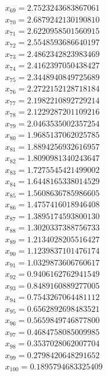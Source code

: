 \begin{multicols}{3}
\begin{align*}
		x_{69} = 2.7523243683867061\\
		x_{70} = 2.6879242130190810\\
		x_{71} = 2.6220958501560915\\
		x_{72} = 2.5548593686640197\\
		x_{73} = 2.4862342823983469\\
		x_{74} = 2.4162397050438427\\
		x_{75} = 2.3448940849725689\\
		x_{76} = 2.2722152128718184\\
		x_{77} = 2.1982210892729214\\
		x_{78} = 2.1229287201109216\\
		x_{79} = 2.0463535002357254\\
		x_{80} = 1.9685137062025785\\
		x_{81} = 1.8894256932616957\\
		x_{82} = 1.8090981340243647\\
		x_{83} = 1.7275545421499002\\
		x_{84} = 1.6448165338014529\\
		x_{85} = 1.5608636785986605\\
		x_{86} = 1.4757416018946408\\
		x_{87} = 1.3895174593800130\\
		x_{88} = 1.3020337388756733\\
		x_{89} = 1.2134028205516427\\
		x_{90} = 1.1239837101476174\\
		x_{91} = 1.0329873606760617\\
		x_{92} = 0.9406162762941549\\
		x_{93} = 0.8489160889277005\\
		x_{94} = 0.7543267064481112\\
		x_{95} = 0.6562892698483521\\
		x_{96} = 0.5659849746877800\\
		x_{97} = 0.4684758085009985\\
		x_{98} = 0.3537028062007704\\
		x_{99} = 0.2798420648291652\\
		x_{100} = 0.1895794683325409
	\end{align*}
\end{multicols}